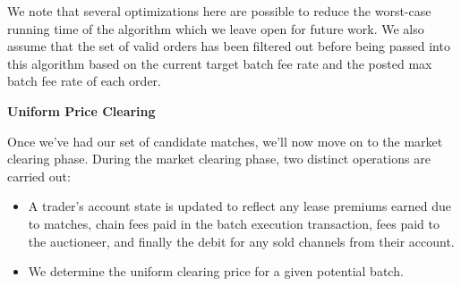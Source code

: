 \documentclass[10pt,a4paper]{article}
\theoremstyle{definition}
\begin{document}
We note that several optimizations here are possible to reduce the worst-case
running time of the algorithm which we leave open for future work. We also
assume that the set of valid orders has been filtered out before being passed
into this algorithm based on the current target batch fee rate and the posted
max batch fee rate of each order.

\begin{center}
    \textbf{Uniform Price Clearing}
\end{center}

Once we've had our set of candidate matches, we'll now move on to the market
clearing phase. During the market clearing phase, two distinct operations are
carried out:
\begin{itemize}
    \item A trader's account state is updated to reflect any lease premiums
        earned due to matches, chain fees paid in the  batch execution
        transaction, fees paid to the auctioneer, and finally the debit for any
        sold channels from their account.

    \item We determine the uniform clearing price for a given potential batch.
\end{itemize}
\end{document}

